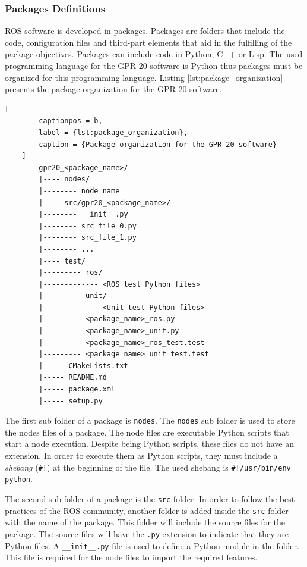 \documentclass{article}
\begin{document}
\subsubsection{Packages Definitions}
ROS software is developed in packages. Packages are folders that include the code, configuration files and third-part elements that aid in the fulfilling of the package objectives. Packages can include code in Python, C++ or Lisp. The used programming language for the GPR-20 software is Python thus packages must be organized for this programming language. Listing \ref{lst:package_organization} presents the package organization for the GPR-20 software.

\begin{singlespace}
    \begin{lstlisting}[
        captionpos = b,
        label = {lst:package_organization},
        caption = {Package organization for the GPR-20 software}
    ]
        gpr20_<package_name>/
        |---- nodes/
        |-------- node_name
        |---- src/gpr20_<package_name>/
        |-------- __init__.py
        |-------- src_file_0.py
        |-------- src_file_1.py
        |-------- ...
        |---- test/
        |--------- ros/
        |------------- <ROS test Python files>
        |--------- unit/
        |------------- <Unit test Python files>
        |--------- <package_name>_ros.py
        |--------- <package_name>_unit.py
        |--------- <package_name>_ros_test.test
        |--------- <package_name>_unit_test.test
        |----- CMakeLists.txt
        |----- README.md
        |----- package.xml
        |----- setup.py
    \end{lstlisting}
\end{singlespace}

The first sub folder of a package is \texttt{nodes}. The \texttt{nodes} sub folder is used to store the nodes files of a package. The node files are executable Python scripts that start a node execution. Despite being Python scripts, these files do not have an extension. In order to execute them as Python scripts, they must include a \textit{shebang} (\texttt{\#!}) at the beginning of the file. The used shebang is \texttt{\#!/usr/bin/env python}. 

The second sub folder of a package is the \texttt{src} folder. In order to follow the best practices of the ROS community, another folder is added inside the \texttt{src} folder with the name of the package. This folder will include the source files for the package. The source files will have the \texttt{.py} extension to indicate that they are Python files. A \texttt{\_\_init\_\_.py} file is used to define a Python module in the folder. This file is required for the node files to import the required features.
\end{document}
